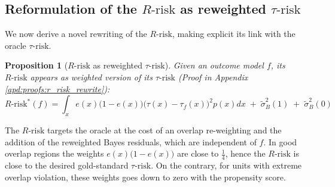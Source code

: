 \documentclass[10pt]{article}
\newtheorem{remark}{Remark}
\newtheorem{proposition}{Proposition}
\begin{document}
\begin{multicols}{2}

    \subsection{Reformulation of the $R\text{-risk}$ as reweighted
        $\tau\text{-risk}$}\label{theory:r_risk_rewrite}

    We now derive a novel rewriting of the $R\text{-risk}$, making explicit its link
    with the oracle $\tau \text{-risk}$.

    \begin{proposition}[$R \text{-risk}$ as reweighted
            $\tau\text{-risk}$]\label{theory:prop:r_risk_rewrite} Given an outcome model
        $f$, its $R\text{-risk}$ appears as weighted version of its $\tau\text{-risk}$
        (Proof in Appendix \ref{apd:proofs:r_risk_rewrite}):
        \begin{equation}
            R\text{-risk}^*(f) = \int_{x} e(x)\big(1-e(x)\big)\big(\tau(x)-\tau_ {f}(x)\big)^{2} p(x) d x \;+\; \tilde{\sigma}_B^2(1) \;+\; \tilde{\sigma}_B^{2}(0)
        \end{equation}
    \end{proposition}

    The $R \text{-risk}$ targets the oracle at the cost of an overlap re-weighting
    and the addition of the reweighted Bayes residuals, which are independent of
    $f$. In good overlap regions the weights $e(x) \big(1-e(x) \big)$ are close to
    $\frac{1}{4}$, hence the $R \text{-risk}$ is close to the desired gold-standard
    $\tau \text{-risk}$. On the contrary, for units with extreme overlap violation,
    these weights goes down to zero with the propensity score.




\end{multicols}
\end{document}
